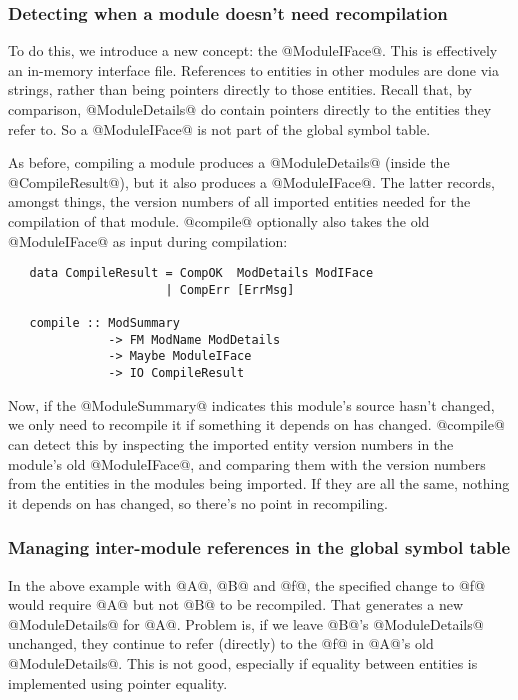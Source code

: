 \documentclass[11pt]{article}
\begin{document}
\subsubsection*{Detecting when a module doesn't need recompilation}

To do this, we introduce a new concept: the @ModuleIFace@.  This is
effectively an in-memory interface file.  References to entities in
other modules are done via strings, rather than being pointers
directly to those entities.  Recall that, by comparison,
@ModuleDetails@ do contain pointers directly to the entities they
refer to.  So a @ModuleIFace@ is not part of the global symbol table.

As before, compiling a module produces a @ModuleDetails@ (inside the
@CompileResult@), but it also produces a @ModuleIFace@.  The latter
records, amongst things, the version numbers of all imported entities
needed for the compilation of that module.  @compile@ optionally also
takes the old @ModuleIFace@ as input during compilation:
\begin{verbatim}
   data CompileResult = CompOK  ModDetails ModIFace
                      | CompErr [ErrMsg]

   compile :: ModSummary 
              -> FM ModName ModDetails
              -> Maybe ModuleIFace
              -> IO CompileResult
\end{verbatim}
Now, if the @ModuleSummary@ indicates this module's source hasn't
changed, we only need to recompile it if something it depends on has
changed.  @compile@ can detect this by inspecting the imported entity
version numbers in the module's old @ModuleIFace@, and comparing them
with the version numbers from the entities in the modules being
imported.  If they are all the same, nothing it depends on has
changed, so there's no point in recompiling.

\subsubsection*{Managing inter-module references in the global symbol table}

In the above example with @A@, @B@ and @f@, the specified change to @f@ would
require @A@ but not @B@ to be recompiled.  That generates a new
@ModuleDetails@ for @A@.  Problem is, if we leave @B@'s @ModuleDetails@ 
unchanged, they continue to refer (directly) to the @f@ in @A@'s old
@ModuleDetails@.  This is not good, especially if equality between
entities is implemented using pointer equality.
\end{document}
